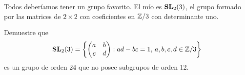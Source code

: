 Todos deberíamos tener un grupo favorito. El mío es $\mathbf{SL}_2(3)$,
el grupo formado por las matrices de $2\times2$ con coeficientes en $\mathbb{Z}/3$ 
con determinante uno.

\begin{exercise}
Demuestre que 
\[
\mathbf{SL}_2(3)=\left\{\begin{pmatrix}a&b\\c&d\end{pmatrix}:ad-bc=1,\,a,b,c,d\in\mathbb{Z}/3\right\}
\]
es un grupo de orden 24 que no posee subgrupos de orden 12.	
\end{exercise}


%


%
%


